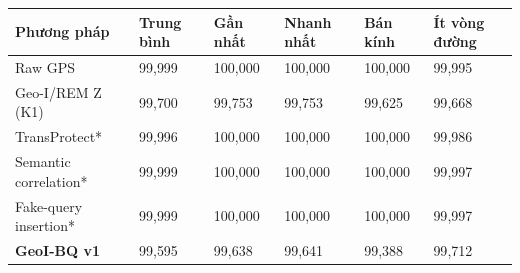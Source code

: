 \par\smallskip\noindent\begin{tabularx}{\linewidth}{@{}P{3.9cm}XXXXX@{}}\toprule
\textbf{Phương pháp} & \textbf{Trung bình} & \textbf{Gần nhất} & \textbf{Nhanh nhất} & \textbf{Bán kính} & \textbf{Ít vòng đường} \\
\midrule
Raw GPS & 99{,}999 & 100{,}000 & 100{,}000 & 100{,}000 & 99{,}995 \\
Geo-I/REM Z (K1) & 99{,}700 & 99{,}753 & 99{,}753 & 99{,}625 & 99{,}668 \\
TransProtect* & 99{,}996 & 100{,}000 & 100{,}000 & 100{,}000 & 99{,}986 \\
Semantic correlation* & 99{,}999 & 100{,}000 & 100{,}000 & 100{,}000 & 99{,}997 \\
Fake-query insertion* & 99{,}999 & 100{,}000 & 100{,}000 & 100{,}000 & 99{,}997 \\
\textbf{GeoI-BQ v1} & 99{,}595 & 99{,}638 & 99{,}641 & 99{,}388 & 99{,}712 \\
\bottomrule\end{tabularx}\par\smallskip
